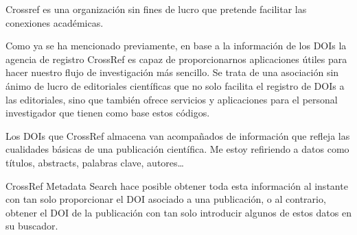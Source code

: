 
Crossref es una organización sin fines de lucro que pretende facilitar las conexiones académicas.


Como ya se ha mencionado previamente, en base a la información de los DOIs la agencia de registro CrossRef es capaz de proporcionarnos aplicaciones útiles para hacer nuestro flujo de investigación más sencillo.
Se trata de una asociación sin ánimo de lucro de editoriales científicas que no solo facilita el registro de DOIs a las editoriales, sino que también ofrece servicios y aplicaciones para el personal investigador que tienen como base estos códigos.

Los DOIs que CrossRef almacena van acompañados de información que refleja las cualidades básicas de una publicación científica. Me estoy refiriendo a datos como títulos, abstracts, palabras clave, autores…

CrossRef Metadata Search hace posible obtener toda esta información al instante con tan solo proporcionar el DOI asociado a una publicación, o al contrario, obtener el DOI de la publicación con tan solo introducir algunos de estos datos en su buscador.









